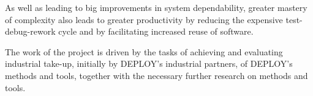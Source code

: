 \documentclass{book}
\begin{document}
As well as leading to big improvements in system dependability, greater mastery of complexity also leads to greater productivity by reducing the expensive test-debug-rework cycle and by facilitating increased reuse of software.

The work of the project is driven by the tasks of achieving and evaluating industrial take-up, initially by DEPLOY's industrial partners, of DEPLOY's methods and tools, together with the necessary further research on methods and tools. 



% 







\clearpage
{} 
\printindex
\end{document}
